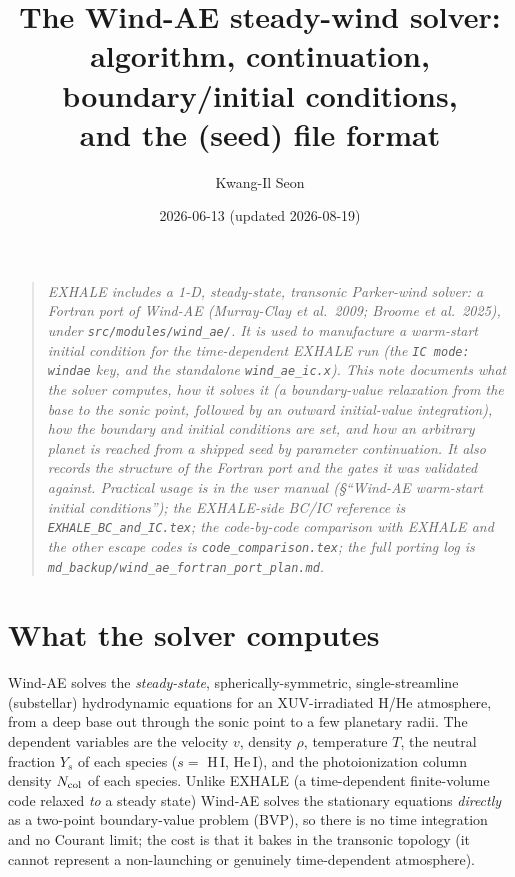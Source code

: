 \documentclass[english,a4paper]{my_memo}
\title{The Wind-AE steady-wind solver:\\
algorithm, continuation, boundary/initial conditions,\\
and the \code{windsoln} (seed) file format}
\author{Kwang-Il Seon}
\date{2026-06-13 (updated 2026-08-19)}
\newcommand{\code}[1]{\texttt{#1}}
\begin{document}
\maketitle

\begin{quote}\small\itshape
EXHALE includes a 1-D, steady-state, transonic Parker-wind solver: a
Fortran port of \emph{Wind-AE} (Murray-Clay et al.\ 2009; Broome et al.\
2025), under \code{src/modules/wind\_ae/}. It is used to manufacture a
warm-start initial condition for the time-dependent EXHALE run (the
\code{IC mode: windae} key, and the standalone \code{wind\_ae\_ic.x}).
This note documents what the solver computes, how it solves it (a
boundary-value relaxation from the base to the sonic point, followed by
an outward initial-value integration), how the boundary and initial
conditions are set, and how an arbitrary planet is reached from a shipped
seed by parameter continuation. It also records the structure of the
Fortran port and the gates it was validated against. Practical usage is
in the user manual (\S``Wind-AE warm-start initial conditions''); the
EXHALE-side BC/IC reference is \code{EXHALE\_BC\_and\_IC.tex}; the
code-by-code comparison with EXHALE and the other escape codes is
\code{code\_comparison.tex}; the full porting log is
\code{md\_backup/wind\_ae\_fortran\_port\_plan.md}.
\end{quote}

\tableofcontents
\bigskip

\section{What the solver computes}
Wind-AE solves the \emph{steady-state}, spherically-symmetric,
single-streamline (substellar) hydrodynamic equations for an
XUV-irradiated H/He atmosphere, from a deep base out through the sonic
point to a few planetary radii. The dependent variables are the velocity
$v$, density $\rho$, temperature $T$, the neutral fraction $Y_s$ of each
species ($s=$ H\,I, He\,I), and the photoionization column density
$N_{\rm col}$ of each species. Unlike EXHALE (a time-dependent
finite-volume code relaxed \emph{to} a steady state) Wind-AE solves
the stationary equations \emph{directly} as a two-point boundary-value
problem (BVP), so there is no time integration and no Courant limit; the
cost is that it bakes in the transonic topology (it cannot represent a
non-launching or genuinely time-dependent atmosphere).
\end{document}
